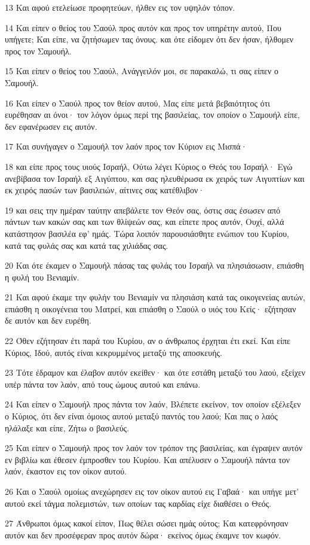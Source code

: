 \par 13 Και αφού ετελείωσε προφητεύων, ήλθεν εις τον υψηλόν τόπον.
\par 14 Και είπεν ο θείος του Σαούλ προς αυτόν και προς τον υπηρέτην αυτού, Που υπήγετε; Και είπε, να ζητήσωμεν τας όνους. και ότε είδομεν ότι δεν ήσαν, ήλθομεν προς τον Σαμουήλ.
\par 15 Και είπεν ο θείος του Σαούλ, Ανάγγειλόν μοι, σε παρακαλώ, τι σας είπεν ο Σαμουήλ.
\par 16 Και είπεν ο Σαούλ προς τον θείον αυτού, Μας είπε μετά βεβαιότητος ότι ευρέθησαν αι όνοι· τον λόγον όμως περί της βασιλείας, τον οποίον ο Σαμουήλ είπε, δεν εφανέρωσεν εις αυτόν.
\par 17 Και συνήγαγεν ο Σαμουήλ τον λαόν προς τον Κύριον εις Μισπά·
\par 18 και είπε προς τους υιούς Ισραήλ, Ούτω λέγει Κύριος ο Θεός του Ισραήλ· Εγώ ανεβίβασα τον Ισραήλ εξ Αιγύπτου, και σας ηλευθέρωσα εκ χειρός των Αιγυπτίων και εκ χειρός πασών των βασιλειών, αίτινες σας κατέθλιβον·
\par 19 και σεις την ημέραν ταύτην απεβάλετε τον Θεόν σας, όστις σας έσωσεν από πάντων των κακών σας και των θλίψεών σας, και είπετε προς αυτόν, Ουχί, αλλά κατάστησον βασιλέα εφ' ημάς. Τώρα λοιπόν παρουσιάσθητε ενώπιον του Κυρίου, κατά τας φυλάς σας και κατά τας χιλιάδας σας.
\par 20 Και ότε έκαμεν ο Σαμουήλ πάσας τας φυλάς του Ισραήλ να πλησιάσωσιν, επιάσθη η φυλή του Βενιαμίν.
\par 21 Και αφού έκαμε την φυλήν του Βενιαμίν να πλησιάση κατά τας οικογενείας αυτών, επιάσθη η οικογένεια του Ματρεί, και επιάσθη ο Σαούλ ο υιός του Κείς· εζήτησαν δε αυτόν και δεν ευρέθη.
\par 22 Όθεν εζήτησαν έτι παρά του Κυρίου, αν ο άνθρωπος έρχηται έτι εκεί. Και είπε Κύριος, Ιδού, αυτός είναι κεκρυμμένος μεταξύ της αποσκευής.
\par 23 Τότε έδραμον και έλαβον αυτόν εκείθεν· και ότε εστάθη μεταξύ του λαού, εξείχεν υπέρ πάντα τον λαόν, από τους ώμους αυτού και επάνω.
\par 24 Και είπεν ο Σαμουήλ προς πάντα τον λαόν, Βλέπετε εκείνον, τον οποίον εξέλεξεν ο Κύριος, ότι δεν είναι όμοιος αυτού μεταξύ παντός του λαού; Και πας ο λαός ηλάλαξε και είπε, Ζήτω ο βασιλεύς.
\par 25 Και είπεν ο Σαμουήλ προς τον λαόν τον τρόπον της βασιλείας, και έγραψεν αυτόν εν βιβλίω και έθεσεν έμπροσθεν του Κυρίου. Και απέλυσεν ο Σαμουήλ πάντα τον λαόν, έκαστον εις τον οίκον αυτού.
\par 26 Και ο Σαούλ ομοίως ανεχώρησεν εις τον οίκον αυτού εις Γαβαά· και υπήγε μετ' αυτού εκεί τάγμα πολεμιστών, των οποίων τας καρδίας είχε διαθέσει ο Θεός.
\par 27 Άνθρωποι όμως κακοί είπον, Πως θέλει σώσει ημάς ούτος; Και κατεφρόνησαν αυτόν και δεν προσέφεραν προς αυτόν δώρα· εκείνος όμως έκαμνε τον κωφόν.

